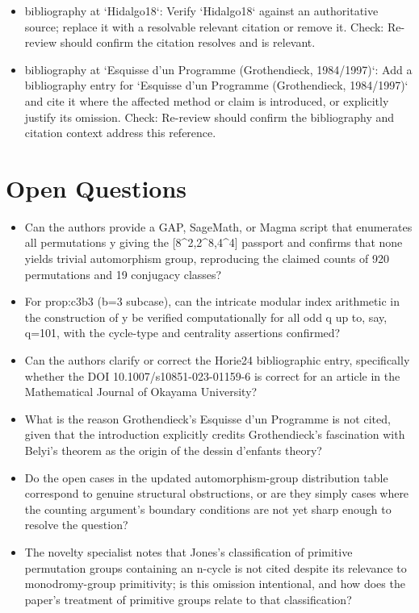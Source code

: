 \documentclass[11pt]{article}
\begin{document}
\begin{itemize}[leftmargin=*]
  \item [open] bibliography at `Hidalgo18`: Verify `Hidalgo18` against an authoritative source; replace it with a resolvable relevant citation or remove it. Check: Re-review should confirm the citation resolves and is relevant.
  \item [open] bibliography at `Esquisse d'un Programme (Grothendieck, 1984/1997)`: Add a bibliography entry for `Esquisse d'un Programme (Grothendieck, 1984/1997)` and cite it where the affected method or claim is introduced, or explicitly justify its omission. Check: Re-review should confirm the bibliography and citation context address this reference.
\end{itemize}

\section*{Open Questions}
\begin{itemize}[leftmargin=*]
  \item Can the authors provide a GAP, SageMath, or Magma script that enumerates all permutations y giving the [8\^{}2,2\^{}8,4\^{}4] passport and confirms that none yields trivial automorphism group, reproducing the claimed counts of 920 permutations and 19 conjugacy classes?
  \item For prop:c3b3 (b=3 subcase), can the intricate modular index arithmetic in the construction of y be verified computationally for all odd q up to, say, q=101, with the cycle-type and centrality assertions confirmed?
  \item Can the authors clarify or correct the Horie24 bibliographic entry, specifically whether the DOI 10.1007/s10851-023-01159-6 is correct for an article in the Mathematical Journal of Okayama University?
  \item What is the reason Grothendieck's Esquisse d'un Programme is not cited, given that the introduction explicitly credits Grothendieck's fascination with Belyi's theorem as the origin of the dessin d'enfants theory?
  \item Do the open cases in the updated automorphism-group distribution table correspond to genuine structural obstructions, or are they simply cases where the counting argument's boundary conditions are not yet sharp enough to resolve the question?
  \item The novelty specialist notes that Jones's classification of primitive permutation groups containing an n-cycle is not cited despite its relevance to monodromy-group primitivity; is this omission intentional, and how does the paper's treatment of primitive groups relate to that classification?
\end{itemize}
\end{document}
